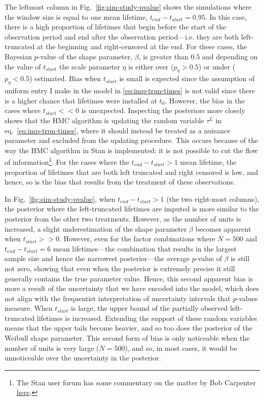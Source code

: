 The leftmost column in Fig.~\ref{fig:sim-study-pvalue} shows the simulations where the window size is equal to one mean lifetime, $t_{end} - t_{start} = 0.95$. In this case, there is a high proportion of lifetimes that begin before the start of the observation period and end after the observation period---i.e. they are both left-truncated at the beginning and right-censored at the end. For these cases, the Bayesian $p$-value of the shape parameter, $\beta$, is greater than $0.5$ and depending on the value of $t_{start}$ the scale parameter $\eta$ is either over ($p_{\eta} > 0.5$) or under ($p_{\eta} < 0.5$) estimated. Bias when $t_{start}$ is small is expected since the assumption of uniform entry I make in the model in \eqref{eq:imp-trun-times} is not valid since there is a higher chance that lifetimes were installed at $t_0$. However, the bias in the cases where $t_{start} << 0$ is unexpected. Inspecting the posteriors more closely shows that the HMC algorithm is updating the random variable $\tau^L$ in eq.~\eqref{eq:imp-trun-times}, where it should instead be treated as a nuisance parameter and excluded from the updating procedure. This occurs because of the way the HMC algorithm in Stan is implemented: it is not possible to cut the flow of information\footnote{The Stan user forum has some commentary on the matter by Bob Carpenter \href{https://discourse.mc-stan.org/t/generating-random-numbers-in-the-model/3608/2}{here}.}. For the cases where the $t_{end} - t_{start} > 1$ mean lifetime, the proportion of lifetimes that are both left truncated and right censored is low, and hence, so is the bias that results from the treatment of these observations. 

In Fig.~\ref{fig:sim-study-pvalue}, when $t_{end} - t_{start} > 1$ (the two right-most columns), the posterior where the left-truncated lifetimes are imputed is more similar to the posterior from the other two treatments. However, as the number of units is increased, a slight underestimation of the shape parameter $\beta$ becomes apparent when $t_{start} >> 0$. However, even for the factor combinations where $N = 500$ and $t_{end} - t_{start} = 6$ mean lifetimes---the combination that results in the largest sample size and hence the narrowest posterior---the average $p$-value of $\beta$ is still not zero, showing that even when the posterior is extremely precise it still generally contains the true parameter value. Hence, this second apparent bias is more a result of the uncertainty that we have encoded into the model, which does not align with the frequentist interpretation of uncertainty intervals that $p$-values measure. When $t_{start}$ is large, the upper bound of the partially observed left-truncated lifetimes is increased. Extending the support of these random variables means that the upper tails become heavier, and so too does the posterior of the Weibull shape parameter. This second form of bias is only noticeable when the number of units is very large ($N = 500$), and so, in most cases, it would be unnoticeable over the uncertainty in the posterior.

